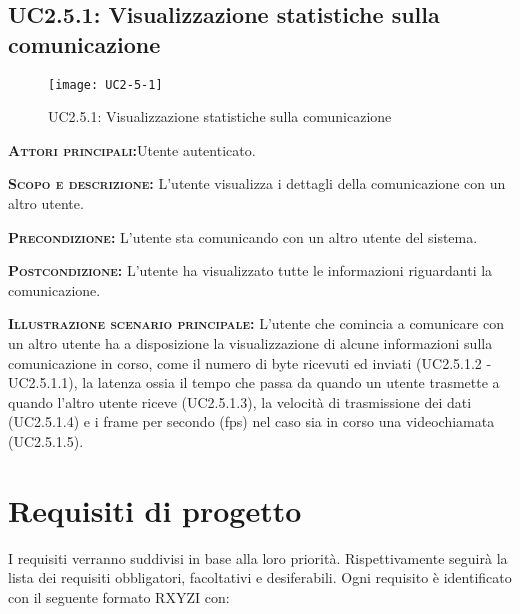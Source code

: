 \subsection{UC2.5.1: Visualizzazione statistiche sulla comunicazione}
\begin{figure}[H]
\begin{center}
\texttt{[image: UC2-5-1]}
\caption{UC2.5.1: Visualizzazione statistiche sulla comunicazione}\label{fig:visualizzazione_statistiche}
\end{center}
\end{figure}
\begin{description}
\item{\scshape\bfseries Attori principali:}Utente autenticato.
\item{\scshape\bfseries Scopo e descrizione:} L'utente visualizza i dettagli della comunicazione con un altro utente.
\item{\scshape\bfseries Precondizione:} L'utente sta comunicando con un altro utente del sistema.
\item{\scshape\bfseries Postcondizione:} L'utente ha visualizzato tutte le informazioni riguardanti la comunicazione.
\item{\scshape\bfseries Illustrazione scenario principale:} L'utente che comincia a comunicare con un altro utente ha a disposizione la visualizzazione di alcune informazioni sulla comunicazione in corso, come il numero di byte ricevuti ed inviati (UC2.5.1.2 - UC2.5.1.1), la latenza ossia il tempo che passa da quando un utente trasmette a quando l'altro utente riceve (UC2.5.1.3), la velocità di trasmissione dei dati (UC2.5.1.4) e i frame per secondo (fps) nel caso sia in corso una videochiamata (UC2.5.1.5).
\end{description}

\newpage\section{Requisiti di progetto}
I requisiti verranno suddivisi in base alla loro priorità. Rispettivamente seguirà la lista dei requisiti obbligatori, facoltativi e desiferabili. Ogni requisito è identificato con il seguente formato RXYZI con:


